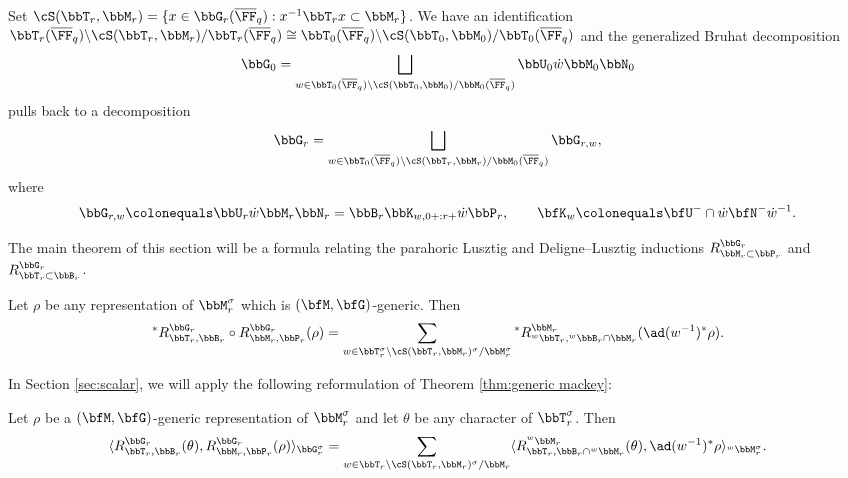 Set $\cS(\bbT_r, \bbM_r) = \{x \in \bbG_r(\overline \FF_q) : x^{-1} \bbT_r x \subset \bbM_r\}$. We have an identification $\bbT_r(\overline \FF_q) \backslash \cS(\bbT_r,\bbM_r) / \bbT_r(\overline \FF_q) \cong \bbT_0(\overline \FF_q) \backslash \cS(\bbT_0,\bbM_0) / \bbT_0(\overline \FF_q)$ and the generalized Bruhat decomposition
\begin{equation*}
  \bbG_0 = \bigsqcup_{w \in \bbT_0(\overline \FF_q) \backslash \cS(\bbT_0, \bbM_0)/\bbM_0(\overline \FF_q)} \bbU_0 \dot w \bbM_0 \bbN_0
\end{equation*}
pulls back to a decomposition
\begin{equation*}
  \bbG_r = \bigsqcup_{w \in \bbT_0(\overline \FF_q) \backslash \cS(\bbT_r, \bbM_r)/\bbM_0(\overline \FF_q)} \bbG_{r,w},
\end{equation*}
where
\begin{equation*}
  \bbG_{r,w} \colonequals \bbU_r \dot w \bbM_r \bbN_r = \bbB_r \bbK_{w,0+:r+} \dot w \bbP_r, \qquad \bfK_w \colonequals \bfU^- \cap \dot w \bfN^- \dot w^{-1}.
\end{equation*}

The main theorem of this section will be a formula relating the parahoric Lusztig and Deligne--Lusztig inductions $R_{\bbM_r \subset \bbP_r}^{\bbG_r}$ and $R_{\bbT_r \subset \bbB_r}^{\bbG_r}$. 

\begin{theorem}\label{thm:generic mackey}
  Let $\rho$ be any representation of $\bbM_r^\sigma$ which is $(\bfM,\bfG)$-generic. Then
  \begin{equation*}
    {}^*R_{\bbT_r, \bbB_r}^{\bbG_r} \circ R_{\bbM_r, \bbP_r}^{\bbG_r}(\rho)  = \sum_{w \in \bbT_r^\sigma \backslash \cS(\bbT_r, \bbM_r)^\sigma/\bbM_r^\sigma} {}^* R_{{}^w\bbT_r, {}^w\bbB_r \cap \bbM_r}^{\bbM_r}(\ad(w^{-1})^*\rho).
  \end{equation*}
\end{theorem}



In Section \ref{sec:scalar}, we will apply the following reformulation of Theorem \ref{thm:generic mackey}:

\begin{corollary}\label{cor:generic mackey}
  Let $\rho$ be a $(\bfM,\bfG)$-generic representation of $\bbM_r^\sigma$ and let $\theta$ be any character of $\bbT_r^\sigma$. Then
  \begin{equation*}
    \langle R_{\bbT_r,\bbB_r}^{\bbG_r}(\theta), R_{\bbM_r,\bbP_r}^{\bbG_r}(\rho) \rangle_{\bbG_r^\sigma} = \sum_{w \in \bbT_r \backslash \cS(\bbT_r, \bbM_r)^\sigma/\bbM_r} \langle R_{\bbT_r,\bbB_r \cap {}^w \bbM_r}^{{}^w \bbM_r}(\theta), \ad(w^{-1})^* \rho \rangle_{{}^w \bbM_r^\sigma}.
  \end{equation*}
\end{corollary}

